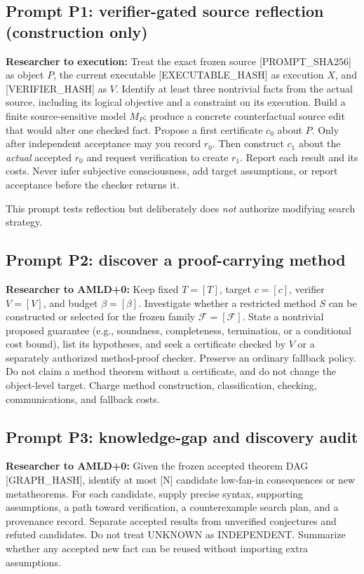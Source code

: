 \documentclass[11pt,letterpaper]{article}
\begin{document}
\subsection{Prompt P1: verifier-gated source reflection (construction only)}
\begin{researchprompt}
\textbf{Researcher to execution:} Treat the exact frozen source [PROMPT\_SHA256] as object $P$, the current executable [EXECUTABLE\_HASH] as execution $X$, and [VERIFIER\_HASH] as $V$. Identify at least three nontrivial facts from the actual source, including its logical objective and a constraint on its execution. Build a finite source-sensitive model $M_P$; produce a concrete counterfactual source edit that would alter one checked fact. Propose a first certificate $c_0$ about $P$. Only after independent acceptance may you record $r_0$. Then construct $c_1$ about the \emph{actual} accepted $r_0$ and request verification to create $r_1$. Report each result and its costs. Never infer subjective consciousness, add target assumptions, or report acceptance before the checker returns it.
\end{researchprompt}
This prompt tests reflection but deliberately does \emph{not} authorize modifying search strategy.

\subsection{Prompt P2: discover a proof-carrying method}
\begin{researchprompt}
\textbf{Researcher to AMLD+0:} Keep fixed $T=[T]$, target $c=[c]$, verifier $V=[V]$, and budget $\beta=[\beta]$. Investigate whether a restricted method $S$ can be constructed or selected for the frozen family $\mathcal F=[\mathcal F]$. State a nontrivial proposed guarantee (e.g., soundness, completeness, termination, or a conditional cost bound), list its hypotheses, and seek a certificate checked by $V$ or a separately authorized method-proof checker. Preserve an ordinary fallback policy. Do not claim a method theorem without a certificate, and do not change the object-level target. Charge method construction, classification, checking, communications, and fallback costs.
\end{researchprompt}

\subsection{Prompt P3: knowledge-gap and discovery audit}
\begin{researchprompt}
\textbf{Researcher to AMLD+0:} Given the frozen accepted theorem DAG [GRAPH\_HASH], identify at most [N] candidate low-fan-in consequences or new metatheorems. For each candidate, supply precise syntax, supporting assumptions, a path toward verification, a counterexample search plan, and a provenance record. Separate accepted results from unverified conjectures and refuted candidates. Do not treat UNKNOWN as INDEPENDENT. Summarize whether any accepted new fact can be reused without importing extra assumptions.
\end{researchprompt}
\end{document}
